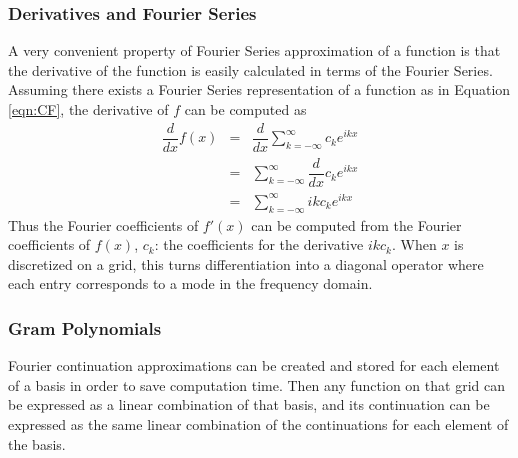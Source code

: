 \documentclass[11pt]{amsart}
\begin{document}
\subsubsection{Derivatives and Fourier Series}
A very convenient property of Fourier Series approximation of a function is that the derivative of the function is easily calculated in terms of the Fourier Series.  Assuming there exists a Fourier Series representation of a function as in Equation \ref{eqn:CF}, the derivative of $f$ can be computed as 
\begin{eqnarray}
\dfrac{d}{dx} f(x) & = & \dfrac{d}{dx}\sum_{k=-\infty}^{\infty} c_k e^{ikx} \\
 & = & \sum_{k=-\infty}^{\infty} \dfrac{d}{dx} c_k e^{ikx} \\
 &=& \sum_{k=-\infty}^{\infty} ik c_k e^{ikx}
\end{eqnarray}
Thus the Fourier coefficients of $f'(x)$ can be computed from the Fourier coefficients of $f(x)$, $c_k$: the coefficients for the derivative $ik c_k$. When $x$ is discretized on a grid, this turns differentiation into a diagonal operator where each entry corresponds to a mode in the frequency domain. 
 
 
 
 
 


%
%

\subsubsection{Gram Polynomials} 


Fourier continuation approximations can be created and stored for each element of a basis in order to save computation time. Then any function on that grid can be expressed as a linear combination of that basis, and its continuation can be expressed as the same linear combination of the continuations for each element of the basis. 
\end{document}

